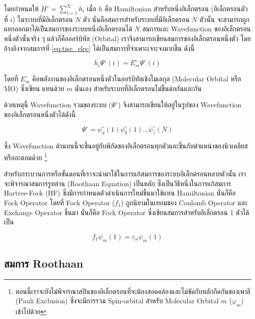 โดยกำหนดให้ $H^{\circ} = \sum^{N}_{i=1} h_{i}$ เมื่อ $h$ คือ Hamiltonian สำหรับหนึ่งอิเล็กตรอน (อิเล็กตรอนตัวที่ $i$) 
ในระบบที่มีอิเล็กตรอน $N$ ตัว นั่นคือสมการสำหรับระบบที่มีอิเล็กตรอน $N$ ตัวนั้น จะสามารถถูกแยกออกมาได้เป็นสมการของระบบหนึ่งอิเล็กตรอนได้ 
$N$ สมการและ Wavefunction ของอิเล็กตรอนหนึ่งตัวนั้นจริง ๆ แล้วก็คือออร์บิทัล (Orbital) เราจึงสามารถเขียนสมการของอิเล็กตรอนหนึ่งตัว%
โดยอ้างอิงจากสมการที่ \ref{eq:tise_elec} ได้เป็นสมการที่จำเพาะเจาะจงมากขึ้น ดังนี้

\begin{equation}\label{eq:tise_elec_i}
    h_{i} \Psi^{\circ}(i) = E^{\circ}_{m} \Psi^{\circ}(i)
\end{equation}

\noindent โดยที่ $E^{\circ}_{m}$ คือพลังงานของอิเล็กตรอนหนึ่งตัวในออร์บิทัลเชิงโมเลกุล (Molecular Orbital หรือ MO) ซึ่งเขียน%
แทนด้วย $m$ นั่นเอง สำหรับระบบที่อิเล็กตรอนไม่ขึ้นต่อกันและกัน

ด้วยเหตุนี้ Wavefunction รวมของระบบ ($\Psi^{\circ}$) จึงสามารถเขียนให้อยู่ในรูปของ Wavefunction ของอิเล็กตรอนหนึ่งตัวได้ดังนี้

\begin{equation}
    \Psi^{\circ} = \psi^{\circ}_{a}(1) \psi^{\circ}_{b}(1) \dots \psi^{\circ}_{z}(N)
\end{equation}

\noindent ซึ่ง Wavefunction ด้านบนนี้จะขึ้นอยู่กับพิกัดของอิเล็กตรอนทุกตัวและขึ้นกับตำแหน่งของนิวเคลียสหรืออะตอมด้วย%
\footnote{ตอนนี้เราจะยังไม่พิจารณาสปินของอิเล็กตรอนที่จะต้องสอดคล้องและไม่ขัดกับหลักกีดกันของเพาลี (Pauli Exclusion)
ซึ่งจะมีการรวม Spin-orbital สำหรับ Molecular Orbital $m$ ($\varphi_{m}$) เข้าไปด้วย}

สำหรับกระบวนการหรือขั้นตอนที่เราจะนำมาใช้ในการแก้สมการของระบบอิเล็กตรอนหลายตัวนั้น เราจะพิจารณาสมการรูทฮาน (Roothaan Equation) 
เป็นหลัก ซึ่งเป็นวิธีหนึ่งในการแก้สมการ Hartree-Fock (HF) ซึ่งมีการกำหนดตัวดำเนินการใหม่ขึ้นมาใช้แทน Hamiltonian นั่นก็คือ Fock Operator 
โดยที่ Fock Operator ($f_{1}$) ถูกนิยามในเทอมของ Coulomb Operator และ Exchange Operator ขึ้นมา นั่นก็คือ Fock Operator 
ซึ่งเขียนสมการสำหรับอิเล็กตรอน 1 ตัวได้เป็น

\begin{equation}\label{eq:fock}
    f_{1} \psi_{m}(1) = \varepsilon_{n} \psi_{m}(1)
\end{equation}

\subsection{สมการ Roothaan}
\label{ssec:roothaan}


